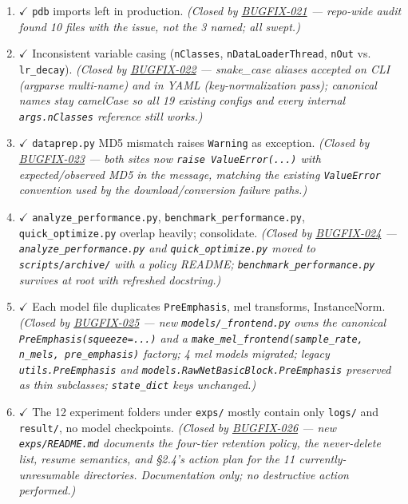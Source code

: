 \documentclass[10pt,a4paper]{article}
\begin{document}
\begin{enumerate}[leftmargin=*,itemsep=2pt]
  \item {\color{green!50!black}$\checkmark$} \texttt{pdb} imports left in production. \textit{(Closed by \href{docs/bugfixes/BUGFIX-021-remove-pdb-imports.md}{BUGFIX-021} --- repo-wide audit found 10 files with the issue, not the 3 named; all swept.)}
  \item {\color{green!50!black}$\checkmark$} Inconsistent variable casing (\texttt{nClasses}, \texttt{nDataLoaderThread}, \texttt{nOut} vs. \texttt{lr\_decay}). \textit{(Closed by \href{docs/bugfixes/BUGFIX-022-camel-snake-case-aliases.md}{BUGFIX-022} --- snake\_case aliases accepted on CLI (argparse multi-name) and in YAML (key-normalization pass); canonical names stay camelCase so all 19 existing configs and every internal \texttt{args.nClasses} reference still works.)}
  \item {\color{green!50!black}$\checkmark$} \texttt{dataprep.py} MD5 mismatch raises \texttt{Warning} as exception. \textit{(Closed by \href{docs/bugfixes/BUGFIX-023-md5-mismatch-proper-error.md}{BUGFIX-023} --- both sites now \texttt{raise ValueError(...)} with expected/observed MD5 in the message, matching the existing \texttt{ValueError} convention used by the download/conversion failure paths.)}
  \item {\color{green!50!black}$\checkmark$} \texttt{analyze\_performance.py}, \texttt{benchmark\_performance.py}, \texttt{quick\_optimize.py} overlap heavily; consolidate. \textit{(Closed by \href{docs/bugfixes/BUGFIX-024-consolidate-performance-scripts.md}{BUGFIX-024} --- \texttt{analyze\_performance.py} and \texttt{quick\_optimize.py} moved to \texttt{scripts/archive/} with a policy README; \texttt{benchmark\_performance.py} survives at root with refreshed docstring.)}
  \item {\color{green!50!black}$\checkmark$} Each model file duplicates \texttt{PreEmphasis}, mel transforms, InstanceNorm. \textit{(Closed by \href{docs/bugfixes/BUGFIX-025-shared-audio-frontend.md}{BUGFIX-025} --- new \texttt{models/\_frontend.py} owns the canonical \texttt{PreEmphasis(squeeze=...)} and a \texttt{make\_mel\_frontend(sample\_rate, n\_mels, pre\_emphasis)} factory; 4 mel models migrated; legacy \texttt{utils.PreEmphasis} and \texttt{models.RawNetBasicBlock.PreEmphasis} preserved as thin subclasses; \texttt{state\_dict} keys unchanged.)}
  \item {\color{green!50!black}$\checkmark$} The 12 experiment folders under \texttt{exps/} mostly contain only \texttt{logs/} and \texttt{result/}, no model checkpoints. \textit{(Closed by \href{docs/bugfixes/BUGFIX-026-exps-cleanup-policy.md}{BUGFIX-026} --- new \texttt{exps/README.md} documents the four-tier retention policy, the never-delete list, resume semantics, and §2.4's action plan for the 11 currently-unresumable directories. Documentation only; no destructive action performed.)}
\end{enumerate}
\end{document}
